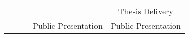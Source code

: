 \begin{table}[htbp]
{\begin{tabular}{ccccc}
		\multicolumn{1}{|c|}{}                   & \multicolumn{1}{c|}{}                     & \multicolumn{1}{c|}{}                                                                                                                    & \multicolumn{1}{c|}{}                                                                                                                 & \multicolumn{1}{c|}{Thesis Delivery}                                                                                \\ \cline{4-5} 
		\multicolumn{1}{|c|}{}                   & \multicolumn{1}{c|}{}                     & \multicolumn{1}{c|}{}                                                                                                                    & \multicolumn{1}{c|}{Public Presentation}                                                                                              & \multicolumn{1}{c|}{Public Presentation}                                                                            \\ \hline
	\end{tabular}
}
\end{table}
